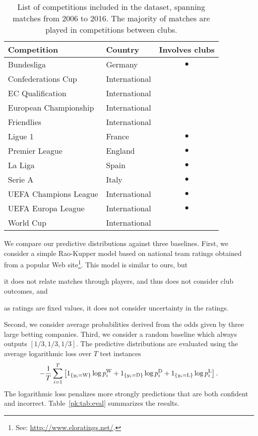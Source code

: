 \begin{table}
  \caption{
List of competitions included in the dataset, spanning matches from 2006 to 2016.
The majority of matches are played in competitions between clubs.}
  \label{pk:tab:competitions}
  \centering
  \begin{tabular}{llc}
    \toprule
    Competition           & Country       & Involves clubs      \\
    \midrule
    Bundesliga            & Germany       & $\bullet$     \\
    Confederations Cup    & International & \\
    EC Qualification      & International & \\
    European Championship & International & \\
    Friendlies            & International & \\
    Ligue 1               & France        & $\bullet$     \\
    Premier League        & England       & $\bullet$     \\
    La Liga               & Spain         & $\bullet$     \\
    Serie A               & Italy         & $\bullet$     \\
    UEFA Champions League & International & $\bullet$     \\
    UEFA Europa League    & International & $\bullet$     \\
    World Cup             & International & \\
    \bottomrule
  \end{tabular}
\end{table}

We compare our predictive distributions against three baselines.
First, we consider a simple Rao-Kupper model based on national team ratings obtained from a popular Web site\footnote{See: \url{http://www.eloratings.net/}.}.
This model is similar to ours, but
\begin{enuminline}
\item it does not relate matches through players, and thus does not consider club outcomes, and
\item as ratings are fixed values, it does not consider uncertainty in the ratings.
\end{enuminline}
Second, we consider average probabilities derived from the odds given by three large betting companies.
Third, we consider a random baseline which always outputs $[1/3, 1/3, 1/3]$.
The predictive distributions are evaluated using the average logarithmic loss over $T$ test instances
\begin{align*}
- \frac{1}{T} \sum_{i=1}^{T} \left[
1_{\left \{ y_i = \text{W} \right \} } \log p^{\text{W}}_i
+ 1_{\left \{ y_i = \text{D} \right \} } \log p^{\text{D}}_i
+ 1_{\left \{ y_i = \text{L} \right \} } \log p^{\text{L}}_i
\right].
\end{align*}
The logarithmic loss penalizes more strongly predictions that are both confident and incorrect.
Table~\ref{pk:tab:eval} summarizes the results.




